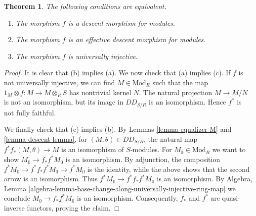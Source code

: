 \documentclass{stacks-project}
\theoremstyle{plain}
\newtheorem{theorem}[subsection]{Theorem}
\theoremstyle{definition}
\theoremstyle{remark}
\numberwithin{equation}{subsection}
\begin{document}
\begin{theorem}
\label{theorem-descent}
The following conditions are equivalent.
\begin{enumerate}
\item[(a)] The morphism $f$ is a descent morphism for modules.
\item[(b)] The morphism $f$ is an effective descent morphism for modules.
\item[(c)] The morphism $f$ is universally injective.
\end{enumerate}
\end{theorem}

\begin{proof}
It is clear that (b) implies (a). We now check that (a) implies (c). If $f$ is 
not universally injective, we can find $M \in \text{Mod}_R$ such that the map
$1_M \otimes f: M \to M \otimes_R S$ has nontrivial kernel $N$.
The natural projection $M \to M/N$ is not an isomorphism, but its image in 
$DD_{S/R}$ is an isomorphism.
Hence $f^*$ is not fully faithful.

\medskip\noindent
We finally check that (c) implies (b). By Lemmas 
\ref{lemma-equalizer-M} and \ref{lemma-descent-lemma}, for
$(M, \theta) \in DD_{S/R}$,
the natural map $f^* f_*(M,\theta) \to M$ is an isomorphism of $S$-modules.
For $M_0 \in \text{Mod}_R$ we want to show $M_0 \to f_*f^*M_0$ is an
isomorphism. By adjunction, the composition
$f^*M_0 \to f^*f_*f^*M_0 \to f^*M_0$ is the identity, while the above
shows that the second arrow is an isomorphism. Thus
$f^*M_0 \to f^*f_*f^*M_0$ is an isomorphism. By Algebra, Lemma
\ref{algebra-lemma-base-change-along-universally-injective-ring-map}
we conclude $M_0 \to f_* f^* M_0$ is an isomorphism.
Consequently, $f_*$ and $f^*$ are  quasi-inverse functors, proving the claim.
\end{proof}
\end{document}
